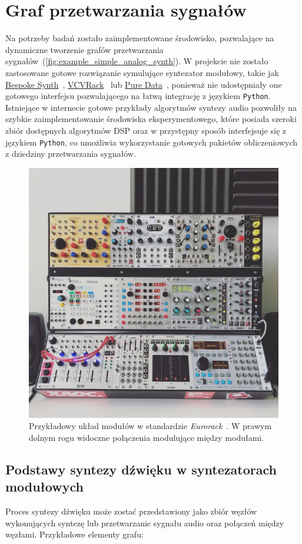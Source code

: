 \chapter{Graf przetwarzania sygnałów}\label{dsp_graph_chapter}

Na potrzeby badań zostało zaimplementowane środowisko, pozwalające na dynamiczne tworzenie grafów przetwarzania
sygnałów~(\ref{fig:example_simple_analog_synth}). W projekcie nie zostało zastosowane gotowe rozwiązanie symulujące syntezator modułowy, takie jak
\href{https://www.bespokesynth.com/}{Bespoke Synth}~\cite{bespoke}, \href{https://vcvrack.com/Rack}{VCVRack}~\cite{vcvrack}
lub \href{https://puredata.info/}{Pure Data}~\cite{pure_data}, ponieważ
nie udostępniały one gotowego interfejsu pozwalającego na łatwą integrację z językiem \texttt{Python}.
Istniejące w internecie gotowe przykłady algorytmów syntezy audio pozwoliły na szybkie zaimplementowanie
środowiska eksperymentowego, które posiada szeroki zbiór dostępnych algorytmów DSP oraz w przystępny sposób
interfejsuje się z językiem \texttt{Python}, co umożliwia wykorzystanie gotowych pakietów obliczeniowych z dziedziny przetwarzania sygnałów.

\begin{figure}[H]\label{fig:eurorack_setup}
    \centering
    \includegraphics[width=0.4\linewidth]{rys05/eurorack.jpg}
    \caption{
      Przykładowy układ modułów w standardzie \textit{Eurorack}~\cite{eurorack}.
      W prawym dolnym rogu widoczne połączenia modulujące między modułami.
    }
\end{figure}

\section{Podstawy syntezy dźwięku w syntezatorach modułowych}

Proces syntezy dźwięku może zostać przedstawiony jako zbiór węzłów wykonujących syntezę lub
przetwarzanie sygnału audio oraz połączeń między węzłami. Przykładowe elementy grafu:

